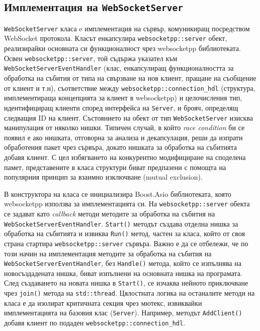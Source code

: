 \documentclass[12pt,a4paper,oneside]{book}
\begin{document}
\subsection{Имплементация на \texttt{WebSocketServer}}

\texttt{WebSocketServer} класа e имплементация на сървър, комуникиращ
посредством WebSocket протокола. Класът енкапсулира \texttt{websocketpp::server}
обект, реализирайки основната си функционалност чрез websocketpp библиотеката.
Освен \texttt{websocketpp::server}, той
съдържа указател към \texttt{WebSocketServerEventHandler} (клас, енкапсулиращ
функционалността за обработка на събития от типа на свързване на нов клиент,
пращане на съобщение от клиент и т.н), съответствие между
\texttt{websocketpp::connection\_hdl} (структура, имплементираща концепцията
за клиент в websocketpp) и целочисления тип, идентифициращ клиенти според
интерфейса на \texttt{Server}, и брояч, определящ следващия ID на
клиент. Състоянието на обект от тип \texttt{WebSocketServer} изисква манипулация от
няколко нишки. Типичен случай, в който \textit{race condition} би се появил е
ако нишката, отговорна за анализа и декапсулация, реши да изпрати обработения
пакет чрез сървъра, докато нишката за обработка на събитията добавя клиент.
С цел избягването на конкурентно модифициране на споделена памет, представените в класа структури биват
предпазени с помощта на популярния принцип за взаимно изключване (mutual
exclusion).

В конструктора на класа се инициализира Boost.Asio библиотеката, която
websocketpp използва за имплементацията си. На \texttt{websocketpp::server} обекта
се задават като \textit{callback} методи методите за обработка на събития на
\texttt{WebSocketServerEventHandler}. \texttt{Start()} методът създава отделна
нишка за обработка на събитията и извиква  \texttt{Run()} метод, частен за
класа, който от своя страна стартира \texttt{websocketpp::server} сървъра. Важно
е да се отбележи, че по този начин на имплементация методите за обработка на
събития на \texttt{WebSocketServerEventHandler}, без \texttt{Handle()} метода, който се изпълнява на
новосъздадената нишка, биват изпълнени на основната нишка на програмата. След
създаването на новата нишка в \texttt{Start()}, се изчаква нейното приключване чрез
\texttt{join()} метода на \texttt{std::thread}. \cite{williams_c++_2012}
Цялостната логика на останалите методи на класа е да изолират критичната секция
чрез мютекс, извиквайки имплементацията на базовия клас (\texttt{Server}).
Например, методът \texttt{AddClient()} добавя клиент по подаден
\texttt{websocketpp::connection\_hdl}.
\end{document}
